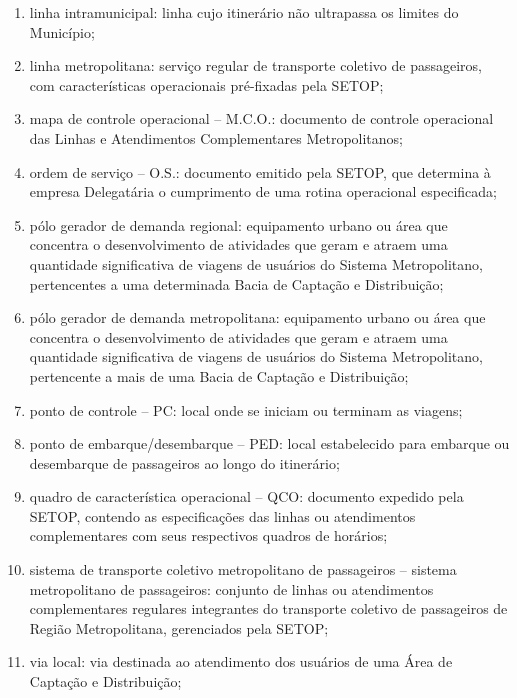 \begin{enumerate}[resume,label=Art. \arabic*]
\begin{enumerate}[label=\roman*.]
\item linha intramunicipal: linha cujo itinerário não ultrapassa os limites do Município;

\item linha metropolitana: serviço regular de transporte coletivo de passageiros, com características operacionais pré-fixadas pela SETOP;

\item mapa de controle operacional – M.C.O.: documento de controle operacional das Linhas e Atendimentos Complementares Metropolitanos;

\item ordem de serviço – O.S.: documento emitido pela SETOP, que determina à empresa Delegatária o cumprimento de uma rotina operacional especificada;

\item pólo gerador de demanda regional: equipamento urbano ou área que concentra o desenvolvimento de atividades que geram e atraem uma quantidade significativa de viagens de usuários do Sistema Metropolitano, pertencentes a uma determinada Bacia de Captação e Distribuição;

\item pólo gerador de demanda metropolitana: equipamento urbano ou área que concentra o desenvolvimento de atividades que geram e atraem uma quantidade significativa de viagens de usuários do Sistema Metropolitano, pertencente a mais de uma Bacia de Captação e Distribuição;

\item ponto de controle – PC: local onde se iniciam ou terminam as viagens;

\item ponto de embarque/desembarque – PED: local estabelecido para embarque ou desembarque de passageiros ao longo do itinerário;

\item quadro de característica operacional – QCO: documento expedido pela SETOP, contendo as especificações das linhas ou atendimentos complementares com seus respectivos quadros de horários;

\item sistema de transporte coletivo metropolitano de passageiros – sistema metropolitano de passageiros: conjunto de linhas ou atendimentos complementares regulares integrantes do transporte coletivo de passageiros de Região Metropolitana, gerenciados pela SETOP;

\item via local: via destinada ao atendimento dos usuários de uma Área de Captação e Distribuição;


\end{enumerate}
\end{enumerate}
